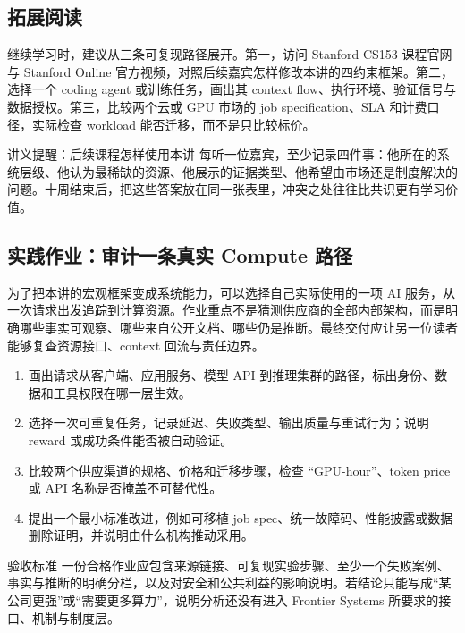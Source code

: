 \documentclass[a4paper]{article}
\begin{document}
\subsection{拓展阅读}

继续学习时，建议从三条可复现路径展开。第一，访问 Stanford CS153 课程官网与 Stanford Online 官方视频，对照后续嘉宾怎样修改本讲的四约束框架。第二，选择一个 coding agent 或训练任务，画出其 context flow、执行环境、验证信号与数据授权。第三，比较两个云或 GPU 市场的 job specification、SLA 和计费口径，实际检查 workload 能否迁移，而不是只比较标价。

\begin{knowledgebox}{讲义提醒：后续课程怎样使用本讲}
每听一位嘉宾，至少记录四件事：他所在的系统层级、他认为最稀缺的资源、他展示的证据类型、他希望由市场还是制度解决的问题。十周结束后，把这些答案放在同一张表里，冲突之处往往比共识更有学习价值。
\end{knowledgebox}

\subsection{实践作业：审计一条真实 Compute 路径}

为了把本讲的宏观框架变成系统能力，可以选择自己实际使用的一项 AI 服务，从一次请求出发追踪到计算资源。作业重点不是猜测供应商的全部内部架构，而是明确哪些事实可观察、哪些来自公开文档、哪些仍是推断。最终交付应让另一位读者能够复查资源接口、context 回流与责任边界。

\begin{enumerate}
  \item 画出请求从客户端、应用服务、模型 API 到推理集群的路径，标出身份、数据和工具权限在哪一层生效。
  \item 选择一次可重复任务，记录延迟、失败类型、输出质量与重试行为；说明 reward 或成功条件能否被自动验证。
  \item 比较两个供应渠道的规格、价格和迁移步骤，检查 ``GPU-hour''、token price 或 API 名称是否掩盖不可替代性。
  \item 提出一个最小标准改进，例如可移植 job spec、统一故障码、性能披露或数据删除证明，并说明由什么机构推动采用。
\end{enumerate}

\begin{importantbox}{验收标准}
一份合格作业应包含来源链接、可复现实验步骤、至少一个失败案例、事实与推断的明确分栏，以及对安全和公共利益的影响说明。若结论只能写成“某公司更强”或“需要更多算力”，说明分析还没有进入 Frontier Systems 所要求的接口、机制与制度层。
\end{importantbox}
\end{document}
